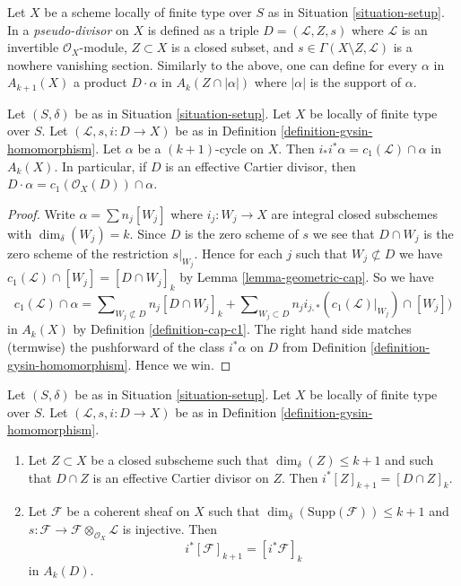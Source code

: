 \begin{remark}
\label{remark-generalize-to-pseudo-divisor}
Let $X$ be a scheme locally of finite type over $S$ as in
Situation \ref{situation-setup}. In \cite{F} a {\it pseudo-divisor} on $X$
is defined as a triple $D = (\mathcal{L}, Z, s)$ where $\mathcal{L}$
is an invertible $\mathcal{O}_X$-module, $Z \subset X$ is a closed subset,
and $s \in \Gamma(X \setminus Z, \mathcal{L})$ is a nowhere vanishing
section. Similarly to the above, one can define for every $\alpha$
in $A_{k + 1}(X)$ a product $D \cdot \alpha$ in $A_k(Z \cap |\alpha|)$
where $|\alpha|$ is the support of $\alpha$.
\end{remark}

\begin{lemma}
\label{lemma-support-cap-effective-Cartier}
Let $(S, \delta)$ be as in Situation \ref{situation-setup}. Let $X$ be locally
of finite type over $S$. Let $(\mathcal{L}, s, i : D \to X)$ be as in
Definition \ref{definition-gysin-homomorphism}. Let $\alpha$ be a
$(k + 1)$-cycle on $X$. Then $i_*i^*\alpha = c_1(\mathcal{L}) \cap \alpha$
in $A_k(X)$. In particular, if $D$ is an effective Cartier divisor, then
$D \cdot \alpha = c_1(\mathcal{O}_X(D)) \cap \alpha$.
\end{lemma}

\begin{proof}
Write $\alpha = \sum n_j[W_j]$ where $i_j : W_j \to X$ are integral closed
subschemes with $\dim_\delta(W_j) = k$.
Since $D$ is the zero scheme of $s$ we see that $D \cap W_j$ is the zero scheme
of the restriction $s|_{W_j}$. Hence for each $j$ such that
$W_j \not \subset D$ we have
$c_1(\mathcal{L}) \cap [W_j] = [D \cap W_j]_k$
by Lemma \ref{lemma-geometric-cap}. So we have
$$
c_1(\mathcal{L}) \cap \alpha
=
\sum\nolimits_{W_j \not \subset D} n_j[D \cap W_j]_k
+
\sum\nolimits_{W_j \subset D}
n_j i_{j, *}(c_1(\mathcal{L})|_{W_j}) \cap [W_j])
$$
in $A_k(X)$ by Definition \ref{definition-cap-c1}.
The right hand side matches (termwise) the pushforward of the class
$i^*\alpha$ on $D$ from Definition \ref{definition-gysin-homomorphism}.
Hence we win.
\end{proof}

\begin{lemma}
\label{lemma-easy-gysin}
Let $(S, \delta)$ be as in Situation \ref{situation-setup}.
Let $X$ be locally of finite type over $S$.
Let $(\mathcal{L}, s, i : D \to X)$ be as in
Definition \ref{definition-gysin-homomorphism}.
\begin{enumerate}
\item Let $Z \subset X$ be a closed subscheme such
that $\dim_\delta(Z) \leq k + 1$ and such that
$D \cap Z$ is an effective Cartier divisor on $Z$. Then
$i^*[Z]_{k + 1} = [D \cap Z]_k$.
\item Let $\mathcal{F}$ be a coherent sheaf on $X$
such that $\dim_\delta(\text{Supp}(\mathcal{F})) \leq k + 1$ and
$s : \mathcal{F} \to \mathcal{F} \otimes_{\mathcal{O}_X} \mathcal{L}$
is injective. Then
$$
i^*[\mathcal{F}]_{k + 1} = [i^*\mathcal{F}]_k
$$
in $A_k(D)$.
\end{enumerate}
\end{lemma}


